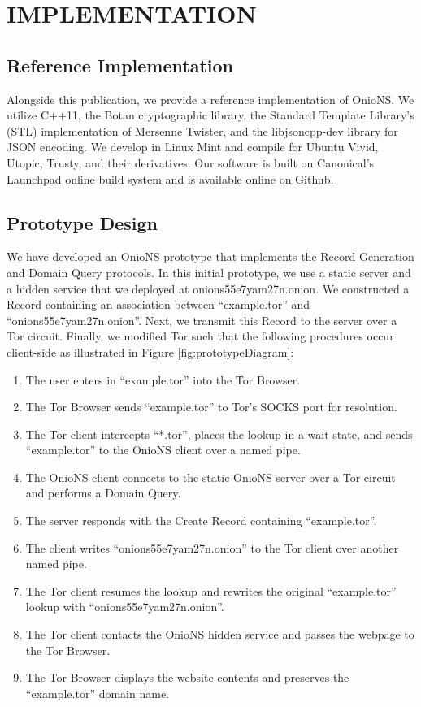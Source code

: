 
\chapter{IMPLEMENTATION}

\section{Reference Implementation}

Alongside this publication, we provide a reference implementation of OnioNS. We utilize C++11, the Botan cryptographic library, the Standard Template Library's (STL) implementation of Mersenne Twister, and the libjsoncpp-dev library for JSON encoding. We develop in Linux Mint and compile for Ubuntu Vivid, Utopic, Trusty, and their derivatives. Our software is built on Canonical's Launchpad online build system and is available online on Github.

\section{Prototype Design}

We have developed an OnioNS prototype that implements the Record Generation and Domain Query protocols. In this initial prototype, we use a static server and a hidden service that we deployed at onions55e7yam27n.onion. We constructed a Record containing an association between ``example.tor'' and ``onions55e7yam27n.onion''. Next, we transmit this Record to the server over a Tor circuit. Finally, we modified Tor such that the following procedures occur client-side as illustrated in Figure \ref{fig:prototypeDiagram}:

\begin{enumerate}
	\item The user enters in ``example.tor'' into the Tor Browser.
	\item The Tor Browser sends ``example.tor'' to Tor's SOCKS port for resolution.
	\item The Tor client intercepts ``*.tor'', places the lookup in a wait state, and sends ``example.tor'' to the OnioNS client over a named pipe.
	\item The OnioNS client connects to the static OnioNS server over a Tor circuit and performs a Domain Query.
	\item The server responds with the Create Record containing ``example.tor''.
	\item The client writes ``onions55e7yam27n.onion'' to the Tor client over another named pipe.
	\item The Tor client resumes the lookup and rewrites the original ``example.tor'' lookup with ``onions55e7yam27n.onion''.
	\item The Tor client contacts the OnioNS hidden service and passes the webpage to the Tor Browser.
	\item The Tor Browser displays the website contents and preserves the ``example.tor'' domain name.
\end{enumerate}

